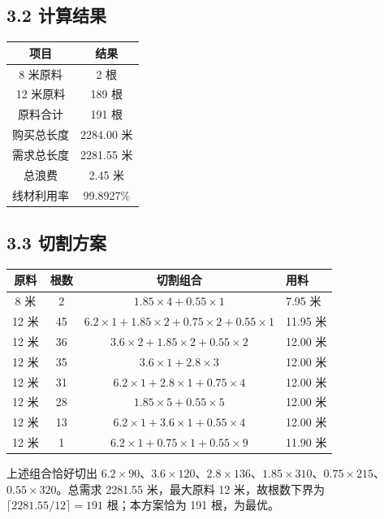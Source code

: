 \documentclass[12pt,a4paper]{ctexart}
\begin{document}
\subsection{3.2 计算结果}
\begin{table}[H]
\centering
\begin{tabular}{cc}
\toprule
项目 & 结果 \\
\midrule
8 米原料 & 2 根 \\
12 米原料 & 189 根 \\
原料合计 & 191 根 \\
购买总长度 & 2284.00 米 \\
需求总长度 & 2281.55 米 \\
总浪费 & 2.45 米 \\
线材利用率 & 99.8927\% \\
\bottomrule
\end{tabular}
\end{table}

\subsection{3.3 切割方案}
\begin{table}[H]
\centering
\begin{tabular}{cccl}
\toprule
原料 & 根数 & 切割组合 & 用料 \\
\midrule
8 米 & 2 & $1.85\times4+0.55\times1$ & 7.95 米 \\
12 米 & 45 & $6.2\times1+1.85\times2+0.75\times2+0.55\times1$ & 11.95 米 \\
12 米 & 36 & $3.6\times2+1.85\times2+0.55\times2$ & 12.00 米 \\
12 米 & 35 & $3.6\times1+2.8\times3$ & 12.00 米 \\
12 米 & 31 & $6.2\times1+2.8\times1+0.75\times4$ & 12.00 米 \\
12 米 & 28 & $1.85\times5+0.55\times5$ & 12.00 米 \\
12 米 & 13 & $6.2\times1+3.6\times1+0.55\times4$ & 12.00 米 \\
12 米 & 1 & $6.2\times1+0.75\times1+0.55\times9$ & 11.90 米 \\
\bottomrule
\end{tabular}
\end{table}

上述组合恰好切出 $6.2\times90$、$3.6\times120$、$2.8\times136$、$1.85\times310$、$0.75\times215$、$0.55\times320$。总需求 2281.55 米，最大原料 12 米，故根数下界为 $\lceil 2281.55/12\rceil=191$ 根；本方案恰为 191 根，为最优。
\end{document}

